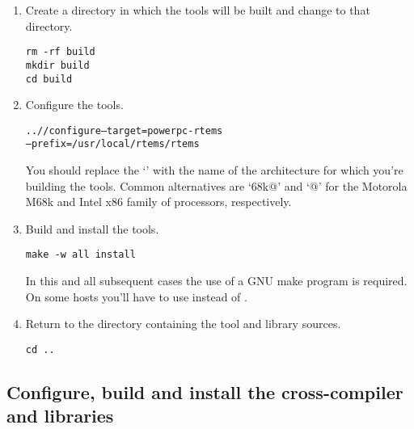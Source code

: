 \documentclass{report}
\begin{document}
\begin{enumerate}
\item Create a directory in which the tools will be built and
change to that directory.
\begin{verbatim}
rm -rf build
mkdir build
cd build
\end{verbatim}

\item Configure the tools.
\begin{alltt}
../\BINUTILS/configure --target=powerpc-rtems\rtemsToolVersion \verb@\@
             --prefix=/usr/local/rtems/rtems\rtemsToolVersion
\end{alltt}
You should replace the `\verb@powerpc@' with the name of the architecture
for which you're
building the tools.  Common alternatives are `\verb@m68k@' and `@' for
the Motorola M68k and Intel x86 family of processors, respectively.

\item Build and install the tools.
\begin{verbatim}
make -w all install
\end{verbatim}
In this and all subsequent cases the use of a GNU make program is required.
On some hosts you'll have to use \verb@gmake@ instead of \verb@make@.

\item Return to the directory containing the tool and library sources.
\begin{verbatim}
cd ..
\end{verbatim}
\end{enumerate}

\subsection {Configure, build and install the cross-compiler and libraries}
\end{document}
